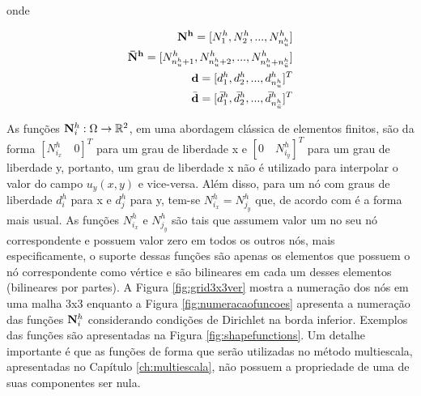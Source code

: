 onde

\begin{eqnarray*}
\mathbf{N^h} = [N^h_1, N^h_2, ..., N^h_{n_u^h} ] \\
\mathbf{\bar{N}^h}  =[N^h_{n_u^h + 1}, N^h_{n_u^h + 2}, ..., N^h_{n_u^h + n_{\bar{u}}^h}] \\
\mathbf{d} = [d_1^h, d_2^h, ... , d_{n_u^h}^h]^T \\
\bar{\mathbf{d}} = [\bar{d}_1^h, \bar{d}_2^h, ... , \bar{d}_{n_{\bar{u}}^h}^h]^T
\end{eqnarray*}


As funções ${\mathbf{N}_{i}^h}: \Omega \rightarrow \mathbb{R}^2$, em uma abordagem clássica de elementos finitos, são da forma $[N^h_{i_x} \quad 0]^T$ para um grau de liberdade x e  $[0 \quad N^h_{i_y}]^T$  para um grau de liberdade y, portanto, um grau de liberdade x não é utilizado para interpolar o valor do campo $u_y(x, y)$ e vice-versa. Além disso, para um nó com  graus de liberdade $d^h_i$ para x e $d^h_j$ para y, tem-se $N^h_{i_x} = N^h_{j_y}$ que, de acordo com \cite{jacob} é a forma mais usual. 
As funções $N^h_{i_x}$  e $N^h_{j_y}$ são tais que assumem valor um no seu nó correspondente e possuem valor zero em todos os outros nós, mais especificamente, o suporte dessas funções são apenas os elementos que possuem o nó correspondente como vértice e são bilineares em cada um desses elementos (bilineares por partes). A Figura \ref{fig:grid3x3ver} mostra a numeração dos nós em uma malha 3x3 enquanto a Figura \ref{fig:numeracaofuncoes} apresenta a numeração das funções ${\mathbf{N}_{i}^h}$ considerando condições de Dirichlet na borda inferior.
Exemplos das funções são apresentadas na Figura \ref{fig:shapefunctions}.
Um detalhe importante é que as funções de forma que serão utilizadas no método multiescala, apresentadas no Capítulo \ref{ch:multiescala}, não possuem a propriedade de uma de suas componentes ser nula.


